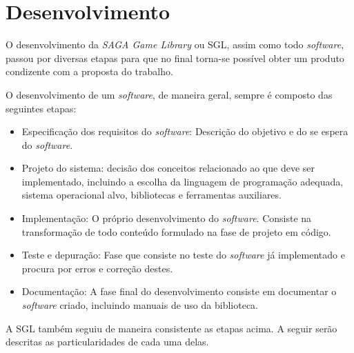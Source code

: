 \chapter{Desenvolvimento}
\label{cap:desenvolvimento}
%
%
O desenvolvimento da \textit{SAGA Game Library} ou SGL, assim como todo \textit{software}, passou por diversas etapas para que no final torna-se possível obter um produto condizente com a proposta do trabalho.
\par 
O desenvolvimento de um \textit{software}, de maneira geral, sempre é composto das seguintes etapas:
%
\begin{itemize}
 \item Especificação dos requisitos do \textit{software}: Descrição do objetivo e do se espera do \textit{software}.
 \item Projeto do sistema: decisão dos conceitos relacionado ao que deve ser implementado, incluindo a escolha da linguagem de programação
 adequada, sistema operacional alvo, bibliotecas e ferramentas auxiliares.
 \item Implementação: O próprio desenvolvimento do \textit{software}. Consiste na transformação de todo conteúdo formulado na fase de projeto em código.
 \item Teste e depuração: Fase que consiste no teste do \textit{software} já implementado e procura por erros e correção destes.
 \item Documentação: A fase final do desenvolvimento consiste em documentar o \textit{software} criado, incluindo manuais de uso da biblioteca.
\end{itemize}
%
\par 
A SGL também seguiu de maneira consistente as etapas acima. A seguir serão descritas as particularidades de cada uma delas.
%
%
%
%
